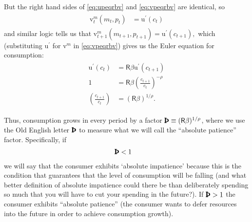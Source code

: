 \documentclass{scrartcl}
\begin{document}
But the right hand sides of \eqref{eq:upeqrbv} and \eqref{eq:vpeqrbv} 
are identical, so
\begin{equation}\begin{gathered}\begin{aligned}
        \mathrm{v}_{t}^{\boldsymbol{\mathit{m}}}(\boldsymbol{\mathit{m}}_{t},\boldsymbol{\mathit{p}}_{t}) & =  \mathrm{u}^{\prime}(\boldsymbol{\mathit{c}}_{t})
\end{aligned}\end{gathered}\end{equation}
and similar logic tells us that $\mathrm{v}_{t+1}^{\boldsymbol{\mathit{m}}}(\boldsymbol{\mathit{m}}_{t+1},\boldsymbol{\mathit{p}}_{t+1})=\mathrm{u}^{\prime}(\boldsymbol{\mathit{c}}_{t+1}),$ which 
(substituting $\mathrm{u}^{\prime}$ for $\mathrm{v}^{\boldsymbol{\mathit{m}}}$ in \eqref{eq:vpeqrbv}) gives us the \hypertarget{EulerCGroFac}{Euler 
equation for consumption}:
\begin{equation}\begin{gathered}\begin{aligned}
        \mathrm{u}^{\prime}(\boldsymbol{\mathit{c}}_{t}) & =  \mathsf{R}\beta \mathrm{u}^{\prime}(\boldsymbol{\mathit{c}}_{t+1}) \\
        1 & =  \mathsf{R}\beta \left(\frac{\boldsymbol{\mathit{c}}_{t+1}}{\boldsymbol{\mathit{c}}_{t}}\right)^{-\rho}
\\  \left(\frac{\boldsymbol{\mathit{c}}_{t+1}}{\boldsymbol{\mathit{c}}_{t}}\right) & =  (\mathsf{R}\beta)^{1/\rho} \label{eq:cgrow}
.
\end{aligned}\end{gathered}\end{equation}

Thus, consumption grows in every period by a factor $\text{\pmb{\Thorn}} \equiv (\mathsf{R}\beta)^{1/\rho}$, where we use the Old English letter $\text{\pmb{\Thorn}}$ to measure what we will call the ``absolute patience'' factor.
Specifically, if 
\begin{equation}\begin{gathered}\begin{aligned}
     \text{\pmb{\Thorn}} & <  1 \label{eq:AIC}
\end{aligned}\end{gathered}\end{equation}
we will say that the consumer exhibits `absolute impatience' because this is the condition that guarantees that the level of consumption will be falling (and what better definition of absolute impatience could there be than deliberately spending so much that you will have to cut your spending in the future?).
If $\text{\pmb{\Thorn}} > 1$ the consumer exhibits ``absolute patience'' (the consumer wants to defer resources into the future in order to achieve consumption growth).
\end{document}
